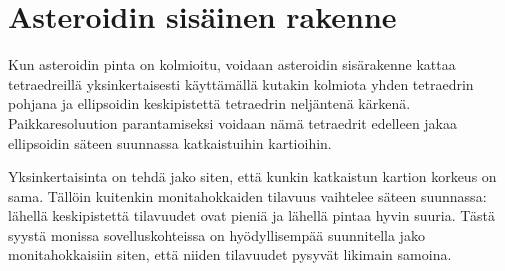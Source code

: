 \documentclass[12pt,a4paper,titlepage]{article}
\begin{document}
\section{Asteroidin sisäinen rakenne}
Kun asteroidin pinta on kolmioitu, voidaan asteroidin sisärakenne kattaa tetraedreillä yksinkertaisesti käyttämällä kutakin kolmiota yhden tetraedrin pohjana ja ellipsoidin keskipistettä tetraedrin neljäntenä kärkenä. Paikkaresoluution parantamiseksi voidaan nämä tetraedrit edelleen jakaa ellipsoidin säteen suunnassa katkaistuihin kartioihin.

Yksinkertaisinta on tehdä jako siten, että kunkin katkaistun kartion korkeus on sama. Tällöin kuitenkin monitahokkaiden tilavuus vaihtelee säteen suunnassa: lähellä keskipistettä tilavuudet ovat pieniä ja lähellä pintaa hyvin suuria. Tästä syystä monissa sovelluskohteissa on hyödyllisempää suunnitella jako monitahokkaisiin siten, että niiden tilavuudet pysyvät likimain samoina.
\end{document}
